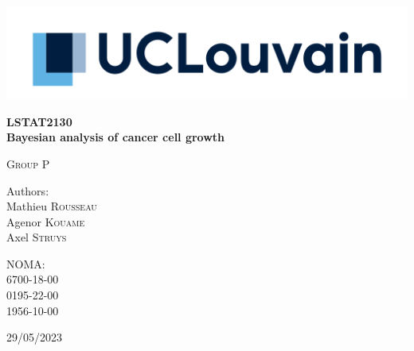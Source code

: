 \begin{titlepage}
	\begin{center}
		\vspace*{1cm}

        \includegraphics[width=\textwidth]{figures/logo_ucl.png}

        \vspace{100pt}

        {\huge \bfseries \huge{LSTAT2130}} \\[0.5cm] 
        {\huge \bfseries \Large{Bayesian analysis of cancer cell growth}}

        \vfill

        \textsc{Group P}\\[0.5cm]
		
		\begin{minipage}{0.4\textwidth}
        \begin{flushleft}
        Authors: \\
        Mathieu \textsc{Rousseau} \\
        Agenor \textsc{Kouame} \\
        Axel \textsc{Struys} \\
        
        \end{flushleft}
        \end{minipage}
        \begin{minipage}{0.4\textwidth}
        \begin{flushright}
        NOMA: \\
        6700-18-00 \\
        0195-22-00 \\
        1956-10-00 \\
        
        \end{flushright}
        \end{minipage}
	
		\vspace{0.8cm}
        
		29/05/2023
	\end{center}
\end{titlepage}